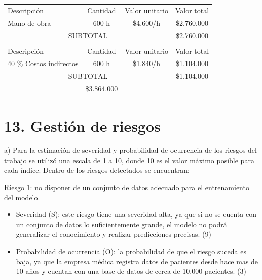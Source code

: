 \documentclass[
11pt, %
]{charter}
\begin{document}
\begin{table}[htpb]
\centering
\begin{tabularx}{\linewidth}{@{}|X|c|r|r|@{}}
\hline
\rowcolor[HTML]{C0C0C0} 
\multicolumn{4}{|c|}{\cellcolor[HTML]{C0C0C0}COSTOS DIRECTOS} \\ \hline
\rowcolor[HTML]{C0C0C0} 
Descripción &
  \multicolumn{1}{c|}{\cellcolor[HTML]{C0C0C0}Cantidad} &
  \multicolumn{1}{c|}{\cellcolor[HTML]{C0C0C0}Valor unitario} &
  \multicolumn{1}{c|}{\cellcolor[HTML]{C0C0C0}Valor total} \\ \hline
  
 Mano de obra &
  \multicolumn{1}{c|}{600 h} &
  \multicolumn{1}{c|}{\$4.600/h} &
  \multicolumn{1}{c|}{\$2.760.000} \\ \hline
\multicolumn{3}{|c|}{SUBTOTAL} &
  \multicolumn{1}{c|}{\$2.760.000} \\ \hline
\rowcolor[HTML]{C0C0C0} 
\multicolumn{4}{|c|}{\cellcolor[HTML]{C0C0C0}COSTOS INDIRECTOS} \\ \hline
\rowcolor[HTML]{C0C0C0} 
Descripción &
  \multicolumn{1}{c|}{\cellcolor[HTML]{C0C0C0}Cantidad} &
  \multicolumn{1}{c|}{\cellcolor[HTML]{C0C0C0}Valor unitario} &
  \multicolumn{1}{c|}{\cellcolor[HTML]{C0C0C0}Valor total} \\ \hline
\multicolumn{1}{|l|}{40 \% Costos indirectos} &
 \multicolumn{1}{c|}{600 h} &
  \multicolumn{1}{c|}{\$1.840/h} &
  \multicolumn{1}{c|}{\$1.104.000} \\ \hline
\multicolumn{3}{|c|}{SUBTOTAL} &
  \multicolumn{1}{c|}{\$1.104.000} \\ \hline
\rowcolor[HTML]{C0C0C0}
\multicolumn{3}{|c|}{TOTAL} & \$3.864.000
   \\ \hline
\end{tabularx}%
\end{table}


\section{13. Gestión de riesgos}
\label{sec:riesgos}

a) Para la estimación de severidad y probabilidad de ocurrencia de los riesgos del trabajo se utilizó una escala de 1 a 10, donde 10 es el valor máximo posible para cada índice. Dentro de los riesgos detectados se encuentran:

Riesgo 1: no disponer de un conjunto de datos adecuado para el entrenamiento del modelo.
\begin{itemize}
	\item Severidad (S): este riesgo tiene una severidad alta, ya que si no se cuenta con un conjunto de datos lo suficientemente grande, el modelo no podrá generalizar el conocimiento y realizar predicciones precisas. (9)
	\item Probabilidad de ocurrencia (O): la probabilidad de que el riesgo suceda es baja, ya que la empresa médica registra datos de pacientes desde hace mas de 10 años y cuentan con una base de datos de cerca de 10.000 pacientes. (3)
\end{itemize}   
\end{document}
